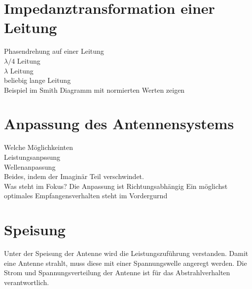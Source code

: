 \section{Impedanztransformation  einer Leitung}
Phasendrehung auf einer Leitung\\
$\lambda/4$ Leitung\\
$\lambda$ Leitung\\
beliebig lange Leitung\\
Beispiel im Smith Diagramm mit normierten Werten zeigen
\section{Anpassung des Antennensystems}
Welche Möglichkeinten\\
Leistungsanpssung\\
Wellenanpassung\\
Beides, indem der  Imaginär Teil verschwindet.\\
Was steht im Fokus? Die Anpassung ist Richtungsabhängig
Ein möglichst optimales Empfangensverhalten steht im Vordergurnd





\section{Speisung}\label{sec:Speisung}
Unter der Speisung der Antenne wird die Leistungszuführung verstanden. Damit eine Antenne strahlt, muss diese mit einer Spannungswelle angeregt werden. Die Strom und Spannungsverteilung der Antenne ist für das Abstrahlverhalten verantwortlich. 

